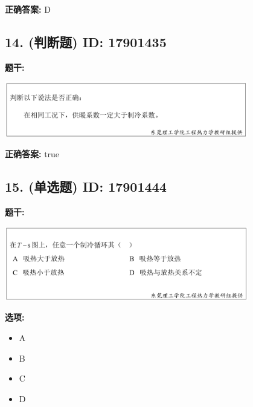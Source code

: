 \documentclass[12pt]{article}
\begin{document}
\textbf{正确答案:}
D

\vspace{0.5em}\hrulefill\vspace{1em}

\subsection*{14. (判断题) \small ID: 17901435}

\textbf{题干:}


\begin{center}\includegraphics[width=0.8\textwidth, height=0.25\textheight, keepaspectratio]{question_14_17901435/title_img_1.png}\end{center}

\textbf{正确答案:}
true

\vspace{0.5em}\hrulefill\vspace{1em}

\subsection*{15. (单选题) \small ID: 17901444}

\textbf{题干:}


\begin{center}\includegraphics[width=0.8\textwidth, height=0.25\textheight, keepaspectratio]{question_15_17901444/title_img_1.png}\end{center}

\textbf{选项:}
\begin{itemize}[leftmargin=*]
  \item A

  \item B

  \item C

  \item D

\end{itemize}
\end{document}
